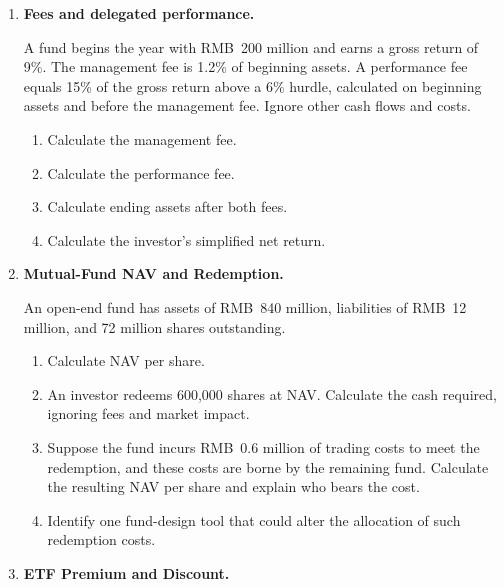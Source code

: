 \begin{enumerate}

\item \textbf{Fees and delegated performance.}

A fund begins the year with RMB~200 million and earns a gross return of 9\%.
The management fee is 1.2\% of beginning assets. A performance fee equals
15\% of the gross return above a 6\% hurdle, calculated on beginning
assets and before the management fee. Ignore other cash flows and costs.

\begin{enumerate}

\item Calculate the management fee.

\item Calculate the performance fee.

\item Calculate ending assets after both fees.

\item Calculate the investor's simplified net return.

\end{enumerate}

\item \textbf{Mutual-Fund NAV and Redemption.}

An open-end fund has assets of RMB~840 million, liabilities of RMB~12 million,
and 72 million shares outstanding.

\begin{enumerate}

\item Calculate NAV per share.

\item An investor redeems 600,000 shares at NAV. Calculate the cash required,
ignoring fees and market impact.

\item Suppose the fund incurs RMB~0.6 million of trading costs to meet the redemption,
and these costs are borne by the remaining fund. Calculate the resulting NAV per share
and explain who bears the cost.

\item Identify one fund-design tool that could alter the allocation of such redemption costs.

\end{enumerate}

\item \textbf{ETF Premium and Discount.}


\end{enumerate}
